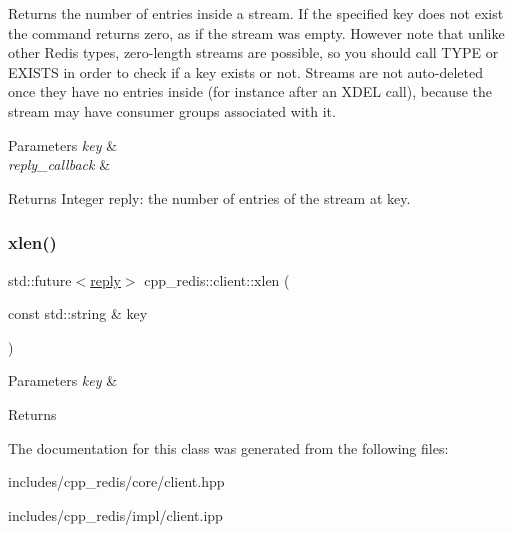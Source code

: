 Returns the number of entries inside a stream. If the specified key does not exist the command returns zero, as if the stream was empty. However note that unlike other Redis types, zero-\/length streams are possible, so you should call T\+Y\+PE or E\+X\+I\+S\+TS in order to check if a key exists or not. Streams are not auto-\/deleted once they have no entries inside (for instance after an X\+D\+EL call), because the stream may have consumer groups associated with it. 


\begin{DoxyParams}{Parameters}
{\em key} & \\
\hline
{\em reply\+\_\+callback} & \\
\hline
\end{DoxyParams}
\begin{DoxyReturn}{Returns}
Integer reply\+: the number of entries of the stream at key. 
\end{DoxyReturn}
\mbox{\label{classcpp__redis_1_1client_a688bed690967583c3aa6a7d72c8c03f9}} 
\subsubsection{\texorpdfstring{xlen()}{xlen()}\hspace{0.1cm}{\footnotesize\ttfamily [2/2]}}
{\footnotesize\ttfamily std\+::future$<$\mbox{\hyperlink{classcpp__redis_1_1reply}{reply}}$>$ cpp\+\_\+redis\+::client\+::xlen (\begin{DoxyParamCaption}\item[{const std\+::string \&}]{key }\end{DoxyParamCaption})}






\begin{DoxyParams}{Parameters}
{\em key} & \\
\hline
\end{DoxyParams}
\begin{DoxyReturn}{Returns}

\end{DoxyReturn}


The documentation for this class was generated from the following files\+:\begin{DoxyCompactItemize}
\item 
includes/cpp\+\_\+redis/core/client.\+hpp\item 
includes/cpp\+\_\+redis/impl/client.\+ipp\end{DoxyCompactItemize}
